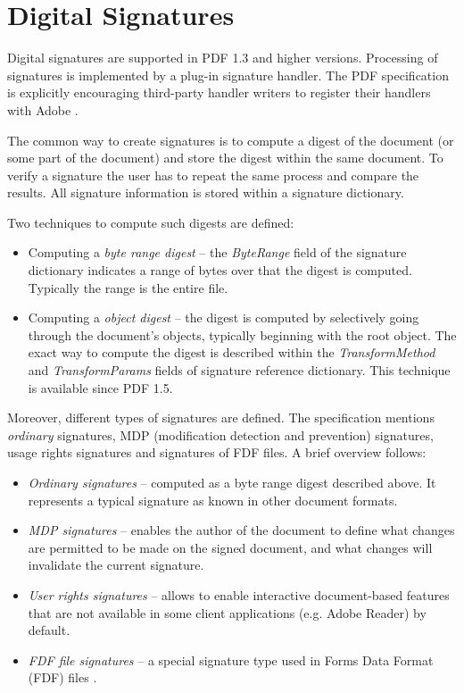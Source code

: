 \documentclass[11pt,oneside]{fithesis2}
\begin{document}
\section{Digital Signatures}
Digital signatures are supported in PDF 1.3 and higher versions. Processing of signatures is implemented by a plug-in signature handler. The PDF specification is explicitly encouraging third-party handler writers to register their handlers with Adobe \cite[p. 725]{pdf_spec}.

The common way to create signatures is to compute a digest of the document (or some part of the document) and store the digest within the same document. To verify a signature the user has to repeat the same process and compare the results. All signature information is stored within a signature dictionary.

Two techniques to compute such digests are defined:

\begin{itemize}
\setlength\itemsep{0.1em}
	\item{Computing a \textit{byte range digest} -- the \textit{ByteRange} field of the signature dictionary indicates a range of bytes over that the digest is computed. Typically the range is the entire file.}
	\item{Computing a \textit{object digest} -- the digest is computed by selectively going through the document's objects, typically beginning with the root object. The exact way to compute the digest is described within the \textit{TransformMethod} and \textit{TransformParams} fields of signature reference dictionary. This technique is available since PDF 1.5.}
\end{itemize}

Moreover, different types of signatures are defined. The specification mentions \textit{ordinary} signatures, MDP (modification detection and prevention) signatures, usage rights signatures and signatures of FDF files. A brief overview follows:

\begin{itemize}
\setlength\itemsep{0.1em}
	\item{\textit{Ordinary signatures} -- computed as a byte range digest described above. It represents a typical signature as known in other document formats.}
	\item{\textit{MDP signatures} -- enables the author of the document to define what changes are permitted to be made on the signed document, and what changes will invalidate the current signature.}
	\item{\textit{User rights signatures} -- allows to enable interactive document-based features that are not available in some client applications (e.g. Adobe Reader) by default.}
	\item{\textit{FDF file signatures} -- a special signature type used in Forms Data Format (FDF) files \cite[p. 710]{pdf_spec}.}
\end{itemize}
\end{document}

